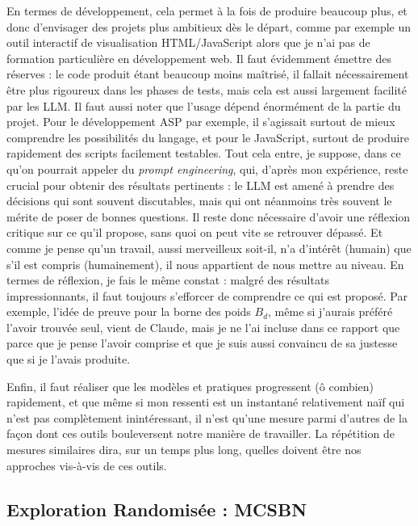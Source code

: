 \documentclass[12pt, a4paper]{article}
\begin{document}
En termes de développement, cela permet à la fois de produire beaucoup plus, et donc d'envisager des projets plus ambitieux dès le départ, comme par exemple un outil interactif de visualisation HTML/JavaScript alors que je n'ai pas de formation particulière en développement web. Il faut évidemment émettre des réserves : le code produit étant beaucoup moins maîtrisé, il fallait nécessairement être plus rigoureux dans les phases de tests, mais cela est aussi largement facilité par les LLM.
Il faut aussi noter que l'usage dépend énormément de la partie du projet. Pour le développement ASP par exemple, il s'agissait surtout de mieux comprendre les possibilités du langage, et pour le JavaScript, surtout de produire rapidement des scripts facilement testables. Tout cela entre, je suppose, dans ce qu'on pourrait appeler du \emph{prompt engineering}, qui, d'après mon expérience, reste crucial pour obtenir des résultats pertinents : le LLM est amené à prendre des décisions qui sont souvent discutables, mais qui ont néanmoins très souvent le mérite de poser de bonnes questions. Il reste donc nécessaire d'avoir une réflexion critique sur ce qu'il propose, sans quoi on peut vite se retrouver dépassé. Et comme je pense qu'un travail, aussi merveilleux soit-il, n'a d'intérêt (humain) que s'il est compris (humainement), il nous appartient de nous mettre au niveau. 
En termes de réflexion, je fais le même constat : malgré des résultats impressionnants, il faut toujours s'efforcer de comprendre ce qui est proposé. Par exemple, l'idée de preuve pour la borne des poids $B_d$, même si j'aurais préféré l'avoir trouvée seul, vient de Claude, mais je ne l'ai incluse dans ce rapport que parce que je pense l'avoir comprise et que je suis aussi convaincu de sa justesse que si je l'avais produite.

Enfin, il faut réaliser que les modèles et pratiques progressent (ô combien) rapidement, et que même si mon ressenti est un instantané relativement naïf qui n'est pas complètement inintéressant, il n'est qu'une mesure parmi d'autres de la façon dont ces outils bouleversent notre manière de travailler. La répétition de mesures similaires dira, sur un temps plus long, quelles doivent être nos approches vis-à-vis de ces outils. 

\subsection{Exploration Randomisée : MCSBN}
\label{sec:mcsbn}
\end{document}
